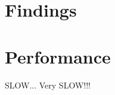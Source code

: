 \section{Findings}
\label{sec:Findings}

\section{Performance}
\label{sec:performance}
SLOW... Very SLOW!!!
